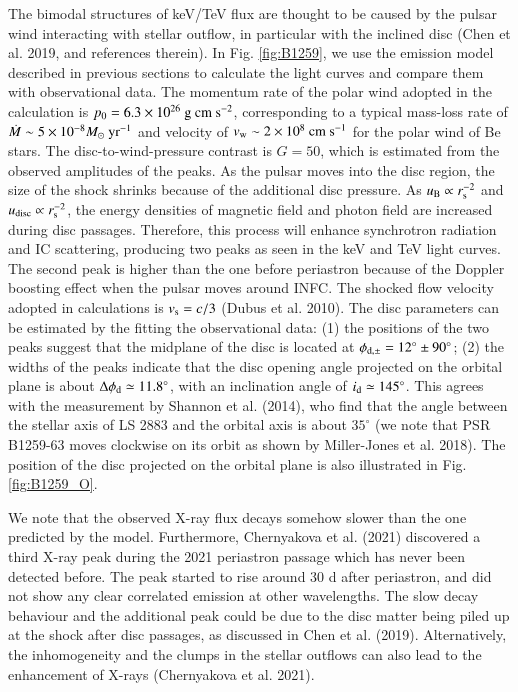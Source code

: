 \documentclass{aa}
\begin{document}
The bimodal structures of keV/TeV flux are thought to be caused by the pulsar wind interacting with stellar outflow, in particular with the inclined disc (Chen et al. 2019, and references therein). In Fig. \ref{fig:B1259}, we use the emission model described in previous sections to calculate the light curves and compare them with observational data.
The momentum rate of the polar wind adopted in the calculation is $p_0=6.3\times10^{26}\ {\rm g\ cm\ s^{-2}}$, corresponding to a typical mass-loss rate of $\dot{M}\sim 5\times10^{-8}M_{\odot}\ {\rm yr}^{-1}$ and velocity of $v_{\rm w}\sim 2\times10^{8}\ {\rm cm\ s^{-1}}$ for the polar wind of Be stars. The disc-to-wind-pressure contrast is $G=50$, which is estimated from the observed amplitudes of the peaks. As the pulsar moves into the disc region, the size of the shock shrinks because of the additional disc pressure.
As $u_{\rm B}\propto r_{\rm s}^{-2}$ and $u_{\rm disc}\propto r_{\rm s}^{-2}$, the energy densities of magnetic field and photon field are increased during disc passages. Therefore, this process will enhance synchrotron radiation and IC scattering, producing two peaks as seen in the keV and TeV light curves.
The second peak is higher than the one before periastron because of the Doppler boosting effect when the pulsar moves around INFC. The shocked flow velocity adopted in calculations is $v_{\rm s}=c/3$ (Dubus et al. 2010).
The disc parameters can be estimated by the fitting the observational data:
(1) the positions of the two peaks suggest that the midplane of the disc is located at $\phi_{\rm d,\pm}=12^{\circ}\pm 90^{\circ}$;
(2) the widths of the peaks indicate that the disc opening angle projected on the orbital plane is about $\Delta\phi_{\rm d}\simeq11.8^{\circ}$, with an inclination angle of $i_{\rm d}\simeq145^{\circ}$. This agrees with the measurement by Shannon et al. (2014), who find that the angle between the stellar axis of LS 2883 and the orbital axis is about $35^{\circ}$ (we note that PSR B1259-63 moves clockwise on its orbit as shown by Miller-Jones et al. 2018).
The position of the disc projected on the orbital plane is also illustrated in Fig. \ref{fig:B1259_O}.

We note that the observed X-ray flux decays somehow slower than the one predicted by the model. Furthermore, Chernyakova et al. (2021) discovered a third X-ray peak during the 2021 periastron passage which has never been detected before. The peak started to rise around 30 d after periastron, and did not show any clear correlated emission at other wavelengths. The slow decay behaviour and the additional peak could be due to the disc matter being piled up at the shock after disc passages, as discussed in Chen et al. (2019). Alternatively, the inhomogeneity and the clumps in the stellar outflows can also lead to the enhancement of X-rays (Chernyakova et al. 2021).
\end{document}
